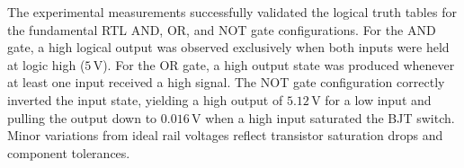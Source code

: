 \begin{table}[H]
	\centering
	\caption{OR Gate Truth Table and Measurements}
	\vspace{2mm}
	\label{tab:orgate9}
\end{table}

\begin{table}[H]
	\centering
	\caption{NOT Gate Truth Table and Measurements}
	\vspace{2mm}
	\label{tab:notgate9}
\end{table}

\label{sec:resultanalysis9}
The experimental measurements successfully validated the logical truth tables for the fundamental RTL AND, OR, and NOT gate configurations. For the AND gate, a high logical output was observed exclusively when both inputs were held at logic high ($5\,\text{V}$). For the OR gate, a high output state was produced whenever at least one input received a high signal. The NOT gate configuration correctly inverted the input state, yielding a high output of $5.12\,\text{V}$ for a low input and pulling the output down to $0.016\,\text{V}$ when a high input saturated the BJT switch. Minor variations from ideal rail voltages reflect transistor saturation drops and component tolerances.

